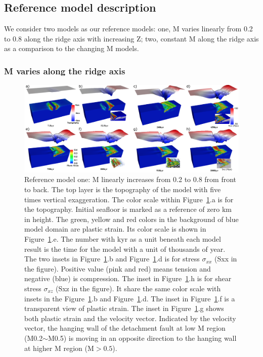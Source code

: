 \subsection{Reference model description}
We consider two models as our reference models: one, M varies linearly from 0.2 to 0.8 along the ridge axis with increasing Z; two, constant M along the ridge axis as a comparison to the changing M models.

\subsubsection{M varies along the ridge axis}

\begin{figure}[hc]
  \centering
    \includegraphics[width=1.0\textwidth]{fig_Results1_1.png}
  \caption{Reference model one: M linearly increases from 0.2 to 0.8 from front to back. The top layer is the topography of the model with five times vertical exaggeration. The color scale within Figure~\ref{fig_Results1_1}.a is for the topography. Initial seafloor is marked as a reference of zero km in height.  The green, yellow and red colors in the background of blue model domain are plastic strain. Its color scale is shown in Figure~\ref{fig_Results1_1}.e. The number with kyr as a unit beneath each model result is the time for the model with a unit of thousands of year. The two insets in Figure~\ref{fig_Results1_1}.b and Figure~\ref{fig_Results1_1}.d is for stress $\sigma_{xx}$ (Sxx in the figure). Positive value (pink and red) means tension and negative (blue) is compression. The inset in Figure~\ref{fig_Results1_1}.h is for shear stress $\sigma_{xz}$ (Sxz in the figure). It share the same color scale with insets in the Figure~\ref{fig_Results1_1}.b and Figure~\ref{fig_Results1_1}.d. The inset in Figure~\ref{fig_Results1_1}.f is a transparent view of plastic strain. The inset in Figure~\ref{fig_Results1_1}.g shows both plastic strain and the velocity vector. Indicated by the velocity vector, the hanging wall of the detachment fault at low M region (M0.2$\sim$M0.5) is moving in an opposite direction to the hanging wall at higher M region (M$>0.5$).} %
 \label{fig_Results1_1}
\end{figure}   

